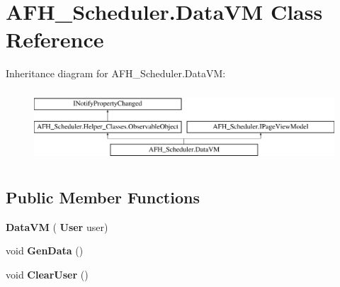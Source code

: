 \section{A\+F\+H\+\_\+\+Scheduler.\+Data\+VM Class Reference}
\label{class_a_f_h___scheduler_1_1_data_v_m}
Inheritance diagram for A\+F\+H\+\_\+\+Scheduler.\+Data\+VM\+:\begin{figure}[H]
\begin{center}
\leavevmode
\includegraphics[height=2.700965cm]{class_a_f_h___scheduler_1_1_data_v_m}
\end{center}
\end{figure}
\subsection*{Public Member Functions}
\begin{DoxyCompactItemize}
\item 
\mbox{\label{class_a_f_h___scheduler_1_1_data_v_m_a113dee7503616a265d1cc353dd8a988f}} 
{\bfseries Data\+VM} (\textbf{ User} user)
\item 
\mbox{\label{class_a_f_h___scheduler_1_1_data_v_m_a065255c434202f71b474860b3546a77c}} 
void {\bfseries Gen\+Data} ()
\item 
\mbox{\label{class_a_f_h___scheduler_1_1_data_v_m_a9fb35689c7af2094dbce93b14a98c9a1}} 
void {\bfseries Clear\+User} ()
\end{DoxyCompactItemize}
